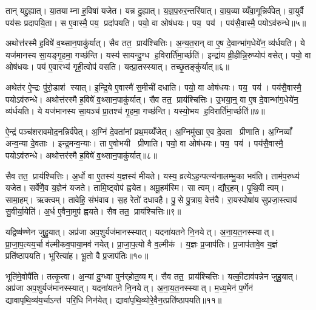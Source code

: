 तान् यद्दु॒ह्यात्। या॒तयाम्ना ह॒विषा॑ यजेत। यन्न दु॒ह्यात्। य॒ज्ञ॒प॒रुर॒न्तरि॑यात्। वा॒य॒व्याय्यँवा॒गून्निर्व॑पेत्। वा॒युर्वै पय॑सः प्रदापयि॒ता। स ए॒वास्मै॒ पय॒ प्रदा॑पयति। पयो॒ वा ओष॑धयः। पय॒ पय॑। पय॑सै॒वास्मै॒ पयोऽव॑रुन्धे॥५॥

अथोत्त॑रस्मै ह॒विषे॑ व॒थ्सान॒पाकु॑र्यात्। सैव तत॒ प्राय॑श्चित्तिः। अ॒न्य॒त॒रान् वा ए॒ष दे॒वान्भा॑ग॒धेये॑न॒ व्य॑र्धयति। ये यज॑मानस्य सा॒यङ्गृ॒हमा॒ गच्छ॑न्ति। यस्य॑ सायन्दु॒ग्ध ह॒विरार्ति॑मा॒र्च्छति॑। इन्द्रा॑य व्री॒हीन्नि॒रुप्योप॑ वसेत्। पयो॒ वा ओष॑धयः। पय॑ ए॒वारभ्य॑ गृही॒त्वोप॑ वसति। यत्प्रा॒तस्स्यात्। तच्छृ॒तङ्कु॑र्यात्॥६॥

अथेत॑र ऐ॒न्द्रः पु॑रो॒डाश॑ स्यात्। इ॒न्द्रि॒ये ए॒वास्मै॑ स॒मीची॑ दधाति। पयो॒ वा ओष॑धयः। पय॒ पय॑। पय॑सै॒वास्मै॒ पयोऽव॑रुन्धे। अथोत्त॑रस्मै ह॒विषे॑ व॒थ्सान॒पाकु॑र्यात्। सैव तत॒ प्राय॑श्चित्तिः। उ॒भया॒न्॒ वा ए॒ष दे॒वान्भा॑ग॒धेये॑न॒ व्य॑र्धयति। ये यज॑मानस्य सा॒यञ्च॑ प्रा॒तश्च॑ गृ॒हमा॒ गच्छ॑न्ति। यस्यो॒भय ह॒विरार्ति॑मा॒र्च्छति॑॥७॥

ऐ॒न्द्रं पञ्च॑शरावमोद॒नन्निर्व॑पेत्। अ॒ग्निं दे॒वता॑नां प्रथ॒मय्यँ॑जेत्। अ॒ग्निमु॑खा ए॒व दे॒वता प्रीणाति। अ॒ग्निव्वाँ अन्व॒न्या दे॒वताः। इन्द्र॒मन्व॒न्याः। ता ए॒वोभयी प्रीणाति। पयो॒ वा ओष॑धयः। पय॒ पय॑। पय॑सै॒वास्मै॒ पयोऽव॑रुन्धे। अथोत्तर॑स्मै ह॒विषे॑ व॒थ्सान॒पाकु॑र्यात्॥८॥

सैव तत॒ प्राय॑श्चित्तिः। अ॒र्धो वा ए॒तस्य॑ य॒ज्ञस्य॑ मीयते। यस्य॒ व्रत्येऽह॒न्पत्न्य॑नालम्भु॒का भव॑ति। ताम॑प॒रुध्य॑ यजेत। सर्वे॑णै॒व य॒ज्ञेन॑ यजते। तामि॒ष्ट्वोप॑ ह्वयेत। अमू॒हम॑स्मि। सा त्वम्। द्यौर॒हम्। पृ॒थि॒वी त्वम्। सामा॒हम्। ऋक्त्वम्। तावेहि॒ संभ॑वाव। स॒ह रेतो॑ दधावहै। पु॒से पु॒त्राय॒ वेत्त॑वै। रा॒यस्पोषा॑य सुप्रजा॒स्त्वाय॑ सु॒वीर्या॒येति॑। अ॒र्ध ए॒वैना॒मुप॑ ह्वयते। सैव तत॒ प्राय॑श्चित्तिः॥९॥\anuvakamend[द॒धा॒ति॒ य॒ज्ञ उ॑त॒ एक॒न्धय॑न्ति रुन्धे कुर्यादा॒र्च्छत्य॒पाकु॑र्यात्पृथि॒वी त्वम॒ष्टौ च॑ (सर्वा॒न्॒ वि वै यदि॑ परस्त॒रामोष॑धीरन्यत॒रानु॒भया॑न॒र्धो वै ॥ )]

यद्विष्ष॑ण्णेन जुहु॒यात्। अप्र॑जा अप॒शुर्यज॑मानस्स्यात्। यदना॑यतने नि॒नयेत्। अ॒ना॒य॒त॒नस्स्यात्। प्रा॒जा॒प॒त्यय॒र्चा व॑ल्मीकव॒पाया॒मव॑ नयेत्। प्रा॒जा॒प॒त्यो वै व॒ल्मीक॑। य॒ज्ञः प्र॒जाप॑तिः। प्र॒जाप॑तावे॒व य॒ज्ञं प्रति॑ष्ठापयति। भूरित्या॑ह। भू॒तो वै प्र॒जाप॑तिः॥१०॥

भूति॑मे॒वोपै॑ति। तत्कृ॒त्वा। अ॒न्यां दु॒ग्ध्वा पुन॑र्‌होत॒व्यम्। सैव तत॒ प्राय॑श्चित्तिः। यत्की॒टाव॑पन्नेन जुहु॒यात्। अप्र॑जा अप॒शुर्यज॑मानस्स्यात्। यदना॑यतने नि॒नयेत्। अ॒ना॒य॒त॒नस्स्यात्। म॒ध्य॒मेन॑ प॒र्णेन॑ द्यावापृथि॒व्य॑य॒र्चाऽन्त॑ परि॒धि निन॑येत्। द्यावा॑पृथि॒व्योरे॒वैन॒त्प्रति॑ष्ठापयति॥११॥

